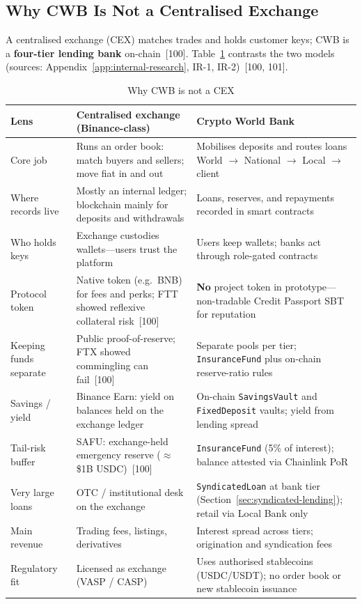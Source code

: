 \documentclass[12pt, a4paper]{report}
\newcommand{\tableheadcolor}{\rowcolor{TableHeadBg}}
\begin{document}
\subsection{Why CWB Is Not a Centralised Exchange}
\label{sec:not-a-cex}

A centralised exchange (CEX) matches trades and holds customer keys; CWB is a \textbf{four-tier lending bank} on-chain~[100]. Table~\ref{tab:cex-vs-cwb} contrasts the two models (sources: Appendix~\ref{app:internal-research}, IR-1, IR-2)~[100, 101].

\begin{table}[H]
\centering
\caption[Why CWB is not a CEX]{Why CWB is not a CEX}
\label{tab:cex-vs-cwb}
\begin{tabular}{p{3.0cm}p{5.3cm}p{5.3cm}}
\toprule
\tableheadcolor
\textbf{Lens} & \textbf{Centralised exchange (Binance-class)} & \textbf{Crypto World Bank} \\
\midrule
Core job & Runs an order book: match buyers and sellers; move fiat in and out & Mobilises deposits and routes loans World $\to$ National $\to$ Local $\to$ client \\
Where records live & Mostly an internal ledger; blockchain mainly for deposits and withdrawals & Loans, reserves, and repayments recorded in smart contracts \\
Who holds keys & Exchange custodies wallets---users trust the platform & Users keep wallets; banks act through role-gated contracts \\
Protocol token & Native token (e.g.\ BNB) for fees and perks; FTT showed reflexive collateral risk~[100] & \textbf{No} project token in prototype---non-tradable Credit Passport SBT for reputation \\
Keeping funds separate & Public proof-of-reserve; FTX showed commingling can fail~[100] & Separate pools per tier; \texttt{InsuranceFund} plus on-chain reserve-ratio rules \\
Savings / yield & Binance Earn: yield on balances held on the exchange ledger & On-chain \texttt{SavingsVault} and \texttt{FixedDeposit} vaults; yield from lending spread \\
Tail-risk buffer & SAFU: exchange-held emergency reserve ($\approx$\$1B USDC)~[100] & \texttt{InsuranceFund} (5\% of interest); balance attested via Chainlink PoR \\
Very large loans & OTC / institutional desk on the exchange & \texttt{SyndicatedLoan} at bank tier (Section~\ref{sec:syndicated-lending}); retail via Local Bank only \\
Main revenue & Trading fees, listings, derivatives & Interest spread across tiers; origination and syndication fees \\
Regulatory fit & Licensed as exchange (VASP / CASP) & Uses authorised stablecoins (USDC/USDT); no order book or new stablecoin issuance \\
\bottomrule
\end{tabular}
\end{table}
\end{document}
